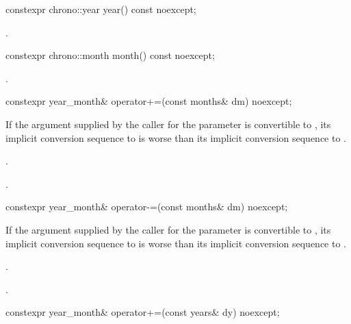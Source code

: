 %
\begin{itemdecl}
constexpr chrono::year year() const noexcept;
\end{itemdecl}

\begin{itemdescr}
\pnum
\returns
{}.
\end{itemdescr}

%
\begin{itemdecl}
constexpr chrono::month month() const noexcept;
\end{itemdecl}

\begin{itemdescr}
\pnum
\returns
{}.
\end{itemdescr}

%
\begin{itemdecl}
constexpr year_month& operator+=(const months& dm) noexcept;
\end{itemdecl}

\begin{itemdescr}
\pnum
\constraints
If the argument supplied by the caller for the  parameter
is convertible to ,
its implicit conversion sequence to 
is worse than its implicit conversion sequence to
.

\pnum
\effects
{}.

\pnum
\returns
{}.
\end{itemdescr}

%
\begin{itemdecl}
constexpr year_month& operator-=(const months& dm) noexcept;
\end{itemdecl}

\begin{itemdescr}
\pnum
\constraints
If the argument supplied by the caller for the  parameter
is convertible to ,
its implicit conversion sequence to 
is worse than its implicit conversion sequence to
.

\pnum
\effects
{}.

\pnum
\returns
{}.
\end{itemdescr}

%
\begin{itemdecl}
constexpr year_month& operator+=(const years& dy) noexcept;
\end{itemdecl}


